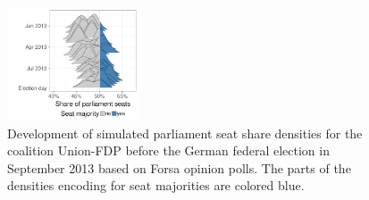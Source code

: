 \documentclass[smallcondensed]{svjour3}     %
\begin{document}
\begin{figure}[!ht]\centering
\includegraphics[width=0.35\textwidth]{figures/bauer_seatDist_time.pdf}
\caption{Development of simulated parliament seat share densities for the coalition Union-FDP before the German federal election in September 2013 based on Forsa opinion polls. The parts of the densities encoding for seat majorities are colored blue.
\label{fig:seatDist_time}
}
\end{figure}
\end{document}
